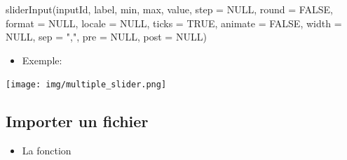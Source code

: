 \documentclass[
]{article}
\newenvironment{Shaded}{\begin{snugshade}}{\end{snugshade}}
\newcommand{\AttributeTok}[1]{\textcolor[rgb]{0.77,0.63,0.00}{#1}}
\newcommand{\CommentTok}[1]{\textcolor[rgb]{0.56,0.35,0.01}{\textit{#1}}}
\newcommand{\ConstantTok}[1]{\textcolor[rgb]{0.00,0.00,0.00}{#1}}
\newcommand{\DecValTok}[1]{\textcolor[rgb]{0.00,0.00,0.81}{#1}}
\newcommand{\FunctionTok}[1]{\textcolor[rgb]{0.00,0.00,0.00}{#1}}
\newcommand{\NormalTok}[1]{#1}
\newcommand{\StringTok}[1]{\textcolor[rgb]{0.31,0.60,0.02}{#1}}
\providecommand{\tightlist}{%
  \setlength{\itemsep}{0pt}\setlength{\parskip}{0pt}}
\begin{document}
\begin{Shaded}
\begin{Highlighting}[]
\FunctionTok{sliderInput}\NormalTok{(inputId, label, min, max, value, }\AttributeTok{step =} \ConstantTok{NULL}\NormalTok{, }\AttributeTok{round =} \ConstantTok{FALSE}\NormalTok{,}
            \AttributeTok{format =} \ConstantTok{NULL}\NormalTok{, }\AttributeTok{locale =} \ConstantTok{NULL}\NormalTok{, }\AttributeTok{ticks =} \ConstantTok{TRUE}\NormalTok{, }\AttributeTok{animate =} \ConstantTok{FALSE}\NormalTok{,}
            \AttributeTok{width =} \ConstantTok{NULL}\NormalTok{, }\AttributeTok{sep =} \StringTok{","}\NormalTok{, }\AttributeTok{pre =} \ConstantTok{NULL}\NormalTok{, }\AttributeTok{post =} \ConstantTok{NULL}\NormalTok{)}
\end{Highlighting}
\end{Shaded}

\begin{itemize}
\tightlist
\item
  Exemple:
\end{itemize}

\begin{Shaded}
\end{Shaded}

\texttt{[image: img/multiple\_slider.png]}

\hypertarget{importer-un-fichier}{%
\subsection{Importer un fichier}\label{importer-un-fichier}}

\begin{itemize}
\tightlist
\item
  La fonction
\end{itemize}
\end{document}
